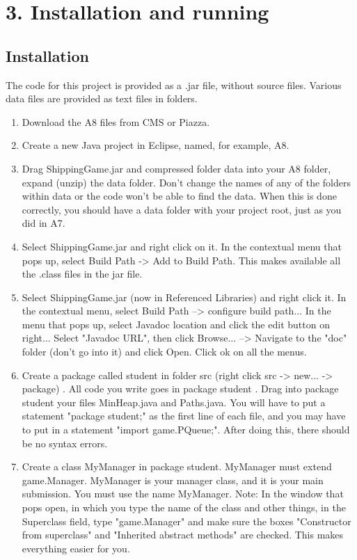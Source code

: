 \documentclass[11pt]{article}
\begin{document}
\section{3. Installation and running}
\subsection{Installation}
The code for this project is provided as a .jar file, without source files. Various data files are provided as text files in folders.
\begin{enumerate}
\item Download the A8 files from CMS or Piazza.
\item Create a new Java project in Eclipse, named, for example, A8. 
\item Drag ShippingGame.jar and compressed folder data into your A8 folder, expand (unzip) the data folder. Don't change
the names of any of the folders within data or the code won't be able to find the data. When this is done correctly, you should have a data folder with your project root, just as you did in A7.
\item Select ShippingGame.jar and right click on it. In the contextual menu that
pops up, select Build Path -> Add to Build Path. This makes available all
the .class files in the jar file.
\item Select ShippingGame.jar (now in Referenced Libraries) and right click it. In the contextual menu, select Build Path --> configure build path... In the menu that pops up, select Javadoc location and click the edit button on right... Select "Javadoc URL", then click Browse... --> Navigate to the "doc" folder (don't go into it) and click Open. Click ok on all the menus.
\item Create a package called student in folder src (right click src -> new... ->
package) . All code you write goes in package student . Drag into
package student your files MinHeap.java and Paths.java. You will have to put a statement
"package student;" as the first line of each file, and you may have to put in
a statement "import game.PQueue;". After doing this, there should be no
syntax errors.

\item Create a class MyManager in package student. MyManager must extend game.Manager.
MyManager is your manager class, and it is your main submission. You must use
the name MyManager.
Note: In the window that pops open, in which you type the name of the
class and other things, in the Superclass field, type "game.Manager" and
make sure the boxes "Constructor from superclass" and "Inherited abstract
methods" are checked. This makes everything easier for you.
\end{enumerate}
\end{document}
